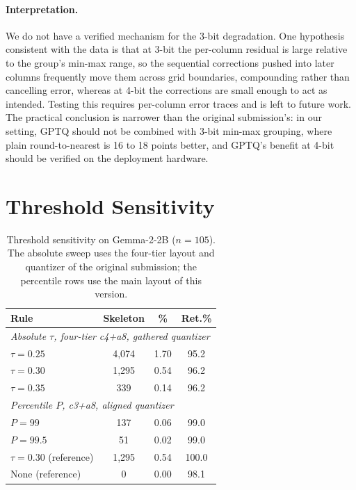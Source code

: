 \documentclass[11pt]{article}
\begin{document}
\paragraph{Interpretation.}
We do not have a verified mechanism for the 3-bit degradation. 
One hypothesis consistent with the data is that at 3-bit the 
per-column residual is large relative to the group's min-max 
range, so the sequential corrections pushed into later columns 
frequently move them across grid boundaries, compounding rather 
than cancelling error, whereas at 4-bit the corrections are 
small enough to act as intended. Testing this requires 
per-column error traces and is left to future work. The 
practical conclusion is narrower than the original submission's: 
in our setting, GPTQ should not be combined with 3-bit min-max 
grouping, where plain round-to-nearest is 16 to 18 points 
better, and GPTQ's benefit at 4-bit should be verified on the 
deployment hardware.

\section{Threshold Sensitivity}
\label{app:threshold}

\begin{table}[t]
\centering
\small
\begin{tabular}{lccc}
\toprule
\textbf{Rule} & \textbf{Skeleton} & \textbf{\%} & \textbf{Ret.\%} \\
\midrule
\multicolumn{4}{l}{\textit{Absolute $\tau$, four-tier c4+a8, gathered quantizer}} \\
$\tau{=}0.25$ & 4,074 & 1.70 & 95.2 \\
$\tau{=}0.30$ & 1,295 & 0.54 & 96.2 \\
$\tau{=}0.35$ & 339 & 0.14 & 96.2 \\
\midrule
\multicolumn{4}{l}{\textit{Percentile $P$, c3+a8, aligned quantizer}} \\
$P{=}99$ & 137 & 0.06 & 99.0 \\
$P{=}99.5$ & 51 & 0.02 & 99.0 \\
$\tau{=}0.30$ (reference) & 1,295 & 0.54 & 100.0 \\
None (reference) & 0 & 0.00 & 98.1 \\
\bottomrule
\end{tabular}
\caption{Threshold sensitivity on Gemma-2-2B ($n{=}105$). The 
absolute sweep uses the four-tier layout and quantizer of the 
original submission; the percentile rows use the main layout 
of this version.}
\label{tab:threshold}
\end{table}
\end{document}

